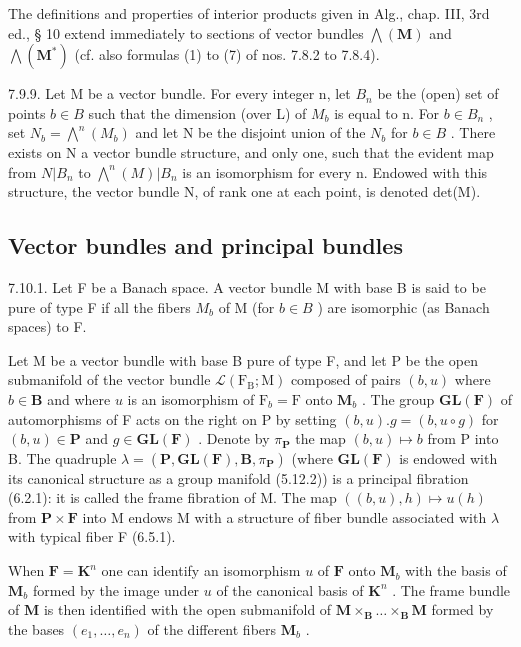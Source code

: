 The definitions and properties of interior products given in Alg., chap. III, 3rd ed., § 10 extend immediately to sections of vector bundles \(\bigwedge(\mathbf{M})\) and \(\bigwedge(\mathbf{M}^{*})\) (cf. also formulas (1) to (7) of nos. 7.8.2 to 7.8.4).

7.9.9. Let M be a vector bundle. For every integer n, let \(B_{n}\) be the (open) set of points \(b \in B\) such that the dimension (over L) of \(M_{b}\) is equal to n. For \(b \in B_{n}\) , set \(N_{b} = \bigwedge^{n}(M_{b})\) and let N be the disjoint union of the \(N_{b}\) for \(b \in B\) . There exists on N a vector bundle structure, and only one, such that the evident map from \(N|B_{n}\) to \(\bigwedge^{n}(M)|B_{n}\) is an isomorphism for every n. Endowed with this structure, the vector bundle N, of rank one at each point, is denoted det(M).

\subsection{Vector bundles and principal bundles}

7.10.1. Let F be a Banach space. A vector bundle M with base B is said to be pure of type F if all the fibers \(M_{b}\) of M (for \(b \in B\) ) are isomorphic (as Banach spaces) to F.

Let M be a vector bundle with base B pure of type F, and let P be the open submanifold of the vector bundle \(\mathcal{L}(\mathrm{F}_{\mathrm{B}}; \mathrm{M})\) composed of pairs \((b, u)\) where \(b \in \mathbf{B}\) and where \(u\) is an isomorphism of \(\mathrm{F}_{b} = \mathrm{F}\) onto \(\mathbf{M}_{b}\) . The group \(\mathbf{GL}(\mathbf{F})\) of automorphisms of F acts on the right on P by setting \((b, u). g = (b, u \circ g)\) for \((b, u) \in \mathbf{P}\) and \(g \in \mathbf{GL}(\mathbf{F})\) . Denote by \(\pi_{\mathbf{P}}\) the map \((b, u) \mapsto b\) from P into B. The quadruple \(\lambda = (\mathbf{P}, \mathbf{GL}(\mathbf{F}), \mathbf{B}, \pi_{\mathbf{P}})\) (where \(\mathbf{GL}(\mathbf{F})\) is endowed with its canonical structure as a group manifold (5.12.2)) is a principal fibration (6.2.1): it is called the frame fibration of M. The map \(((b, u), h) \mapsto u(h)\) from \(\mathbf{P} \times \mathbf{F}\) into M endows M with a structure of fiber bundle associated with \(\lambda\) with typical fiber F (6.5.1).

When \(\mathbf{F} = \mathbf{K}^n\) one can identify an isomorphism \(u\) of \(\mathbf{F}\) onto \(\mathbf{M}_b\) with the basis of \(\mathbf{M}_b\) formed by the image under \(u\) of the canonical basis of \(\mathbf{K}^n\) . The frame bundle of \(\mathbf{M}\) is then identified with the open submanifold of \(\mathbf{M} \times_{\mathbf{B}} \ldots \times_{\mathbf{B}} \mathbf{M}\) formed by the bases \((e_1, \ldots, e_n)\) of the different fibers \(\mathbf{M}_b\) .

